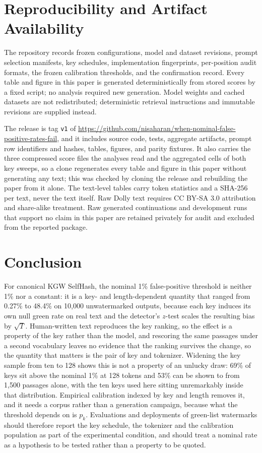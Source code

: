 \documentclass[conference]{IEEEtran}
\begin{document}
\section{Reproducibility and Artifact Availability}

The repository records frozen configurations, model and dataset revisions, prompt
selection manifests, key schedules, implementation fingerprints, per-position
audit formats, the frozen calibration thresholds, and the confirmation record.
Every table and figure in this paper is generated deterministically from stored
scores by a fixed script; no analysis required new generation. Model weights and
cached datasets are not redistributed; deterministic retrieval instructions and
immutable revisions are supplied instead.

The release is tag \texttt{v1} of
\url{https://github.com/nisaharan/when-nominal-false-positive-rates-fail}, and it
includes source code, tests, aggregate artifacts, prompt row identifiers and
hashes, tables, figures, and parity fixtures. It also carries the three compressed
score files the analyses read and the aggregated cells of both key sweeps, so a clone regenerates every table and figure in
this paper without generating any text; this was checked by cloning the release
and rebuilding the paper from it alone. The text-level tables carry token
statistics and a SHA-256 per text, never the text itself. Raw Dolly text requires
CC BY-SA 3.0 attribution and share-alike treatment. Raw generated continuations
and development runs that support no claim in this paper are retained privately
for audit and excluded from the reported package.

\section{Conclusion}

For canonical KGW SelfHash, the nominal 1\% false-positive threshold is neither
1\% nor a constant: it is a key- and length-dependent quantity that ranged from
0.27\% to 48.4\% on 10,000 unwatermarked outputs, because each key induces its
own null green rate on real text and the detector's $z$-test scales the resulting
bias by $\sqrt{T}$. Human-written text reproduces the key ranking, so the effect is
a property of the key rather than the model, and rescoring the same passages under
a second vocabulary leaves no evidence that the ranking survives the change, so
the quantity that matters is the pair of key and tokenizer. Widening the key
sample from ten to 128 shows this is not a property of an unlucky draw: 69\% of
keys sit above the nominal 1\% at 128 tokens and 53\% can be shown to from 1,500
passages alone, with the ten keys used here sitting unremarkably inside that
distribution. Empirical calibration indexed by key and length removes it, and it
needs a corpus rather than a generation campaign, because what the threshold
depends on is $p_k$. Evaluations and deployments of green-list watermarks should
therefore report the key schedule, the tokenizer and the calibration population as
part of the experimental condition, and should treat a nominal rate as a
hypothesis to be tested rather than a property to be quoted.
\end{document}
